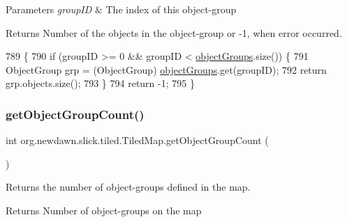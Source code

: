 \begin{DoxyParams}{Parameters}
{\em group\+ID} & The index of this object-\/group \\
\hline
\end{DoxyParams}
\begin{DoxyReturn}{Returns}
Number of the objects in the object-\/group or -\/1, when error occurred. 
\end{DoxyReturn}

\begin{DoxyCode}
789                                            \{
790         \textcolor{keywordflow}{if} (groupID >= 0 && groupID < \mbox{\hyperlink{classorg_1_1newdawn_1_1slick_1_1tiled_1_1_tiled_map_aa446ef4b07ea80ab5f112e8512ed7561}{objectGroups}}.size()) \{
791             ObjectGroup grp = (ObjectGroup) \mbox{\hyperlink{classorg_1_1newdawn_1_1slick_1_1tiled_1_1_tiled_map_aa446ef4b07ea80ab5f112e8512ed7561}{objectGroups}}.get(groupID);
792             \textcolor{keywordflow}{return} grp.objects.size();
793         \}
794         \textcolor{keywordflow}{return} -1;
795     \}
\end{DoxyCode}
\mbox{\label{classorg_1_1newdawn_1_1slick_1_1tiled_1_1_tiled_map_aa39650c84fe749bbe63ee1f65a80df20}} 
\subsubsection{\texorpdfstring{get\+Object\+Group\+Count()}{getObjectGroupCount()}}
{\footnotesize\ttfamily int org.\+newdawn.\+slick.\+tiled.\+Tiled\+Map.\+get\+Object\+Group\+Count (\begin{DoxyParamCaption}{ }\end{DoxyParamCaption})\hspace{0.3cm}{\ttfamily [inline]}}

Returns the number of object-\/groups defined in the map.

\begin{DoxyReturn}{Returns}
Number of object-\/groups on the map 
\end{DoxyReturn}

